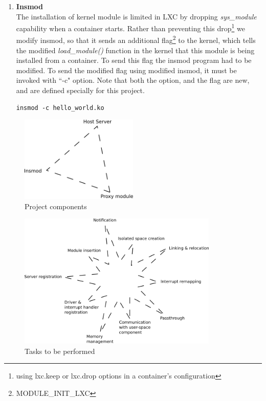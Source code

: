 \documentclass[twoside]{iitbreport}
\begin{document}
\begin{enumerate}
\item \textbf{Insmod}\\
The installation of kernel module is limited in LXC by dropping \textit{sys\_module} capability when a container starts. Rather than preventing this drop\footnote{using lxc.keep or lxc.drop options in a container's configuration} we modify insmod, so that it sends an additional flag\footnote{MODULE\_INIT\_LXC} to the kernel, which tells the modified \textit{load\_module()} function in the kernel that this module is being installed from a container.
To send this flag the insmod program had to be modified. To send the modified flag using modified insmod, it must be invoked with ``-c" option. Note that both the option, and the flag are new, and are defined specially for this project.
\begin{lstlisting}
insmod -c hello_world.ko
\end{lstlisting}
\end{enumerate}



\begin{figure}[ht]
\centering
\includegraphics[width=0.5\textwidth]{components_svg}
\caption{Project components\label{fig:componnts1}}
\end{figure}

\begin{figure}[ht]
\centering
\includegraphics[width=0.85\textwidth]{tasks_svg}
\caption{Tasks to be performed\label{fig:tasks1}}
\end{figure}
\end{document}

